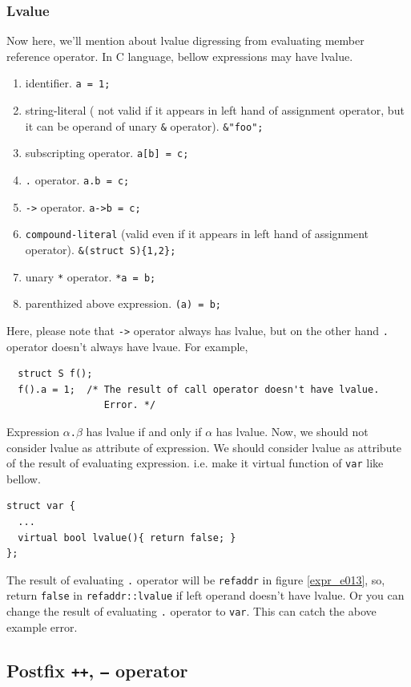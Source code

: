 \subsubsection{Lvalue}
\label{expr_e023}
Now here, we'll mention about lvalue digressing from
evaluating member reference operator.
In C language, bellow expressions may have lvalue.
\begin{enumerate}
\item identifier. {\tt{a = 1;}}
\item string-literal ( not valid if it appears in left hand of
assignment operator, but it can be operand of unary {\tt{\&}} operator).
{\tt{\&"foo";}}
\item subscripting operator. {\tt{a[b] = c;}}
\item {\tt{.}} operator. {\tt{a.b = c;}}
\item {\tt{->}} operator. {\tt{a->b = c;}}
\item {\tt{compound-literal}} (valid even if it appears in left hand of
assignment operator). {\tt{\&(struct S)\{1,2\};}}
\item unary {\tt{*}} operator. {\tt{*a = b;}}
\item parenthized above expression. {\tt{(a) = b;}}
\end{enumerate}
Here, please note that {\tt{->}} operator always has lvalue,
but on the other hand {\tt{.}} operator doesn't always have lvaue.
For example,
\begin{verbatim}
  struct S f();
  f().a = 1;  /* The result of call operator doesn't have lvalue.
                 Error. */
\end{verbatim}
Expression {\tt{$\alpha$.$\beta$}} has lvalue if and only if
$\alpha$ has lvalue.
Now, we should not consider lvalue as attribute of expression.
We should consider lvalue as attribute of the result of evaluating
expression. i.e. make it virtual function of {\tt{var}} like bellow.
\begin{verbatim}
struct var {
  ...
  virtual bool lvalue(){ return false; }
};
\end{verbatim}

The result of evaluating {\tt{.}} operator will be
{\tt{refaddr}} in figure \ref{expr_e013}, so, return {\tt{false}}
in {\tt{refaddr::lvalue}} if left operand doesn't have lvalue.
Or you can change the result of evaluating {\tt{.}} operator
to {\tt{var}}. This can catch the above example error.

\subsection{Postfix {\tt{++}}, {\tt{--}} operator}
\label{expr_e007}

